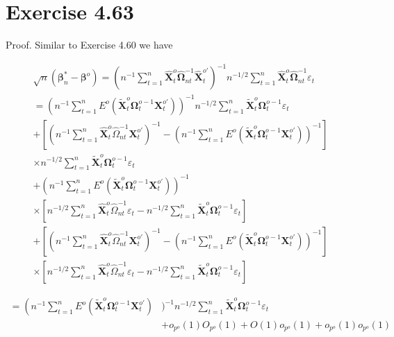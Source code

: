 \documentclass[10pt]{article}
\begin{document}
\section*{Exercise 4.63}
Proof. Similar to Exercise 4.60 we have

$$
\begin{gathered}
\sqrt{n}\left(\boldsymbol{\beta}_{n}^{*}-\boldsymbol{\beta}^{o}\right)=\left(n^{-1} \sum_{t=1}^{n} \hat{\mathbf{X}}_{t}^{o} \hat{\mathbf{\Omega}}_{n t}^{-1} \hat{\mathbf{X}}_{t}^{o \prime}\right)^{-1} n^{-1 / 2} \sum_{t=1}^{n} \hat{\mathbf{X}}_{t}^{o} \hat{\mathbf{\Omega}}_{n t}^{-1} \varepsilon_{t} \\
=\left(n^{-1} \sum_{t=1}^{n} E^{o}\left(\tilde{\mathbf{X}}_{t}^{o} \boldsymbol{\Omega}_{t}^{o-1} \mathbf{X}_{t}^{o \prime}\right)\right)^{-1} n^{-1 / 2} \sum_{t=1}^{n} \tilde{\mathbf{X}}_{t}^{o} \boldsymbol{\Omega}_{t}^{o-1} \varepsilon_{t} \\
+\left[\left(n^{-1} \sum_{t=1}^{n} \hat{\mathbf{X}}_{t}^{o} \hat{\Omega}_{n t}^{-1} \mathbf{X}_{t}^{o \prime}\right)^{-1}-\left(n^{-1} \sum_{t=1}^{n} E^{o}\left(\tilde{\mathbf{X}}_{t}^{o} \boldsymbol{\Omega}_{t}^{o-1} \mathbf{X}_{t}^{o \prime}\right)\right)^{-1}\right] \\
\times n^{-1 / 2} \sum_{t=1}^{n} \tilde{\mathbf{X}}_{t}^{o} \boldsymbol{\Omega}_{t}^{o-1} \varepsilon_{t} \\
+\left(n^{-1} \sum_{t=1}^{n} E^{o}\left(\tilde{\mathbf{X}}_{t}^{o} \boldsymbol{\Omega}_{t}^{o-1} \mathbf{X}_{t}^{o \prime}\right)\right)^{-1} \\
\times\left[n^{-1 / 2} \sum_{t=1}^{n} \hat{\mathbf{X}}_{t}^{o} \hat{\Omega}_{n t}^{-1} \varepsilon_{t}-n^{-1 / 2} \sum_{t=1}^{n} \tilde{\mathbf{X}}_{t}^{o} \boldsymbol{\Omega}_{t}^{o-1} \varepsilon_{t}\right] \\
+\left[\left(n^{-1} \sum_{t=1}^{n} \hat{\mathbf{X}}_{t}^{o} \hat{\Omega}_{n t}^{-1} \mathbf{X}_{t}^{o \prime}\right)^{-1}-\left(n^{-1} \sum_{t=1}^{n} E^{o}\left(\tilde{\mathbf{X}}_{t}^{o} \boldsymbol{\Omega}_{t}^{o-1} \mathbf{X}_{t}^{o \prime}\right)\right)^{-1}\right] \\
\times\left[n^{-1 / 2} \sum_{t=1}^{n} \hat{\mathbf{X}}_{t}^{o} \hat{\Omega}_{n t}^{-1} \varepsilon_{t}-n^{-1 / 2} \sum_{t=1}^{n} \tilde{\mathbf{X}}_{t}^{o} \boldsymbol{\Omega}_{t}^{o-1} \varepsilon_{t}\right]
\end{gathered}
$$

$$
\begin{aligned}
=\left(n^{-1} \sum_{t=1}^{n} E^{o}\left(\tilde{\mathbf{X}}_{t}^{o} \boldsymbol{\Omega}_{t}^{o-1} \mathbf{X}_{t}^{o \prime}\right)\right. & )^{-1} n^{-1 / 2} \sum_{t=1}^{n} \tilde{\mathbf{X}}_{t}^{o} \boldsymbol{\Omega}_{t}^{o-1} \varepsilon_{t} \\
& +o_{p^{o}}(1) O_{p^{o}}(1)+O(1) o_{p^{o}}(1)+o_{p^{o}}(1) o_{p^{o}}(1)
\end{aligned}
$$
\end{document}
